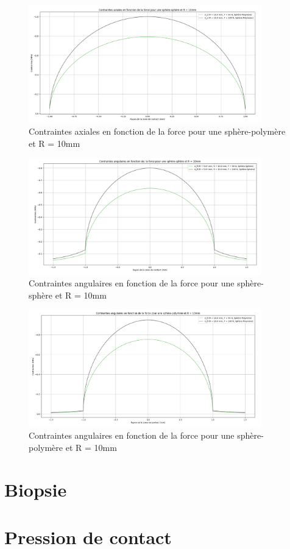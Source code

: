 \documentclass[a4paper,12pt]{article}
\begin{document}
\begin{figure}[H] %
	\centering
	\includegraphics[width=0.9\textwidth]{ax4.png} %
	\caption{Contraintes axiales en fonction de la force pour une sphère-polymère et R = 10mm} %
	\label{fig:mon_image10} %
\end{figure}
\clearpage
\begin{figure}[H] %
	\centering
	\includegraphics[width=0.9\textwidth]{ang3.png} %
	\caption{Contraintes angulaires en fonction de la force pour une sphère-sphère et R = 10mm} %
	\label{fig:mon_image11} %
\end{figure}

\begin{figure}[H] %
	\centering
	\includegraphics[width=0.9\textwidth]{ang4.png} %
	\caption{Contraintes angulaires en fonction de la force pour une sphère-polymère et R = 10mm} %
	\label{fig:mon_image12} %
\end{figure}
\clearpage
\section{Biopsie}


\section{Pression de contact}
\end{document}
